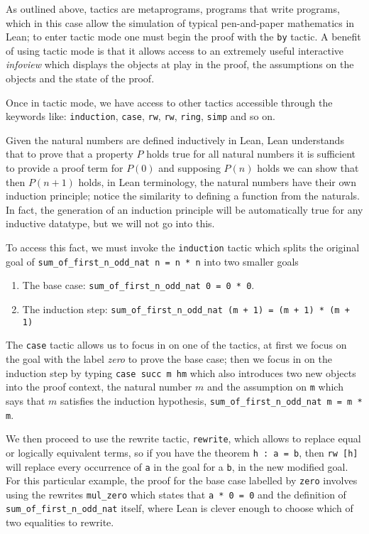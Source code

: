 \begin{example}
    As outlined above, tactics are metaprograms, programs that write programs, which in this case allow the simulation of typical pen-and-paper mathematics
    in Lean; to enter tactic mode one must begin the proof with the \texttt{by} tactic. A benefit of using tactic mode is that it allows access to an extremely useful
    interactive \textit{infoview} which displays the objects at play in the proof, the assumptions on the objects and the state of the proof.

    Once in tactic mode, we have access to other tactics accessible through the keywords like: \texttt{induction}, \texttt{case}, \texttt{rw}, \texttt{rw}, \texttt{ring}, \texttt{simp} and so on.
    
    Given the natural numbers are defined inductively in Lean, Lean understands that to prove that a property $P$ holds true for all natural numbers
    it is sufficient to provide a proof term for $P(0)$ and supposing $P(n)$ holds we can show that then $P(n+1)$ holds, in Lean terminology, the natural numbers
    have their own induction principle; notice the similarity to defining a function from the naturals. In fact, the generation of an induction principle 
    will be automatically true for any inductive datatype, but we will not go into this.
    
    To access this fact, we must invoke the \texttt{induction} tactic which splits the original goal of \texttt{sum\_of\_first\_n\_odd\_nat n = n * n} into two smaller goals

    \begin{enumerate}
        \item The base case: \texttt{sum\_of\_first\_n\_odd\_nat 0 = 0 * 0}.
        \item The induction step: \texttt{sum\_of\_first\_n\_odd\_nat (m + 1) = (m + 1) * (m + 1)}
    \end{enumerate}

    The \texttt{case} tactic allows us to focus in on one of the tactics, at first we focus on the goal with the label \textit{zero} to prove the base case;
    then we focus in on the induction step by typing \texttt{case succ m hm} which also introduces two new objects into the proof context, the natural number $m$ and the assumption
    on \texttt{m} which says that $m$ satisfies the induction hypothesis, \texttt{sum\_of\_first\_n\_odd\_nat m = m * m}. 
    
    We then proceed to use the rewrite tactic, \texttt{rewrite}, which allows to replace equal or logically equivalent terms, so if you have the theorem \texttt{h : a = b}, then \texttt{rw [h]} will replace every occurrence of \texttt{a} in the goal
    for a \texttt{b}, in the new modified goal. For this particular example, the proof for the base case labelled by \texttt{zero} involves using the rewrites \texttt{mul_zero} which states that \texttt{a * 0 = 0} and
    the definition of  \texttt{sum\_of\_first\_n\_odd\_nat} itself, where Lean is clever enough to choose which of two equalities to rewrite.


\end{example}
